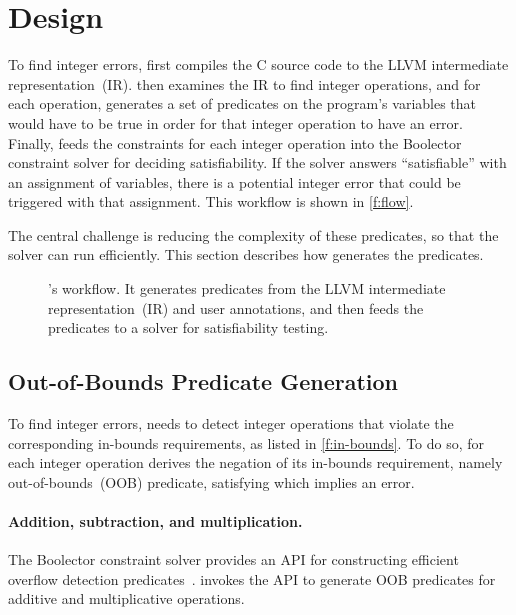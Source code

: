 \section{Design}
\label{s:gen}

To find integer errors, \sys first compiles the C source code to the
LLVM intermediate representation~(IR).  \sys then examines the IR to
find integer operations, and for each operation, \sys generates a
set of predicates on the program's variables that would have to be
true in order for that integer operation to have an error.  Finally,
\sys feeds the constraints for each integer operation into the
Boolector constraint solver for deciding satisfiability.  If the
solver answers ``satisfiable'' with an assignment of variables,
there is a potential integer error that could be triggered with
that assignment.  This workflow is shown in \autoref{f:flow}.

The central challenge is reducing the complexity of these predicates,
so that the solver can run efficiently.  This section describes how
\sys generates the predicates.

\begin{figure}
\centering
\resizebox{\linewidth}{!}{

}
\caption{\sys's workflow.  It generates predicates from the LLVM
intermediate representation~(IR) and user annotations, and then feeds
the predicates to a solver for satisfiability testing.}
\label{f:flow}
\end{figure}

\subsection{Out-of-Bounds Predicate Generation}
\label{s:gen:oob}

To find integer errors, \sys needs to detect integer operations
that violate the corresponding in-bounds requirements, as listed
in \autoref{f:in-bounds}.  To do so, for each integer operation
\sys derives the negation of its in-bounds requirement, namely
out-of-bounds~(OOB) predicate, satisfying which implies an error.

\paragraph{Addition, subtraction, and multiplication.}
The Boolector constraint solver provides an API for constructing
efficient overflow detection
predicates~\cite[\chapterautorefname~3.5]{brummayer:phd}.
\sys invokes the API to generate OOB predicates for additive and
multiplicative operations.

